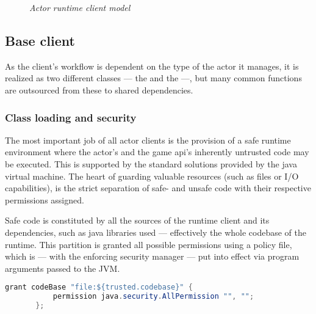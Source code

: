 \begin{figure}[h]
		\caption*{\emph{Actor runtime client model}}
	\end{figure}
	
		\subsection{Base client}

			As the client's workflow is dependent on the type of the actor it manages, it is realized as two different classes --- the  and the  ---, but many common functions are outsourced from these to shared dependencies.

			\subsubsection*{Class loading and security}
		
			The most important job of all actor clients is the provision of a safe runtime environment where the actor's and the game api's inherently untrusted code may be executed. This is supported by the standard solutions provided by the java virtual machine. The heart of guarding valuable resources (such as files or \mbox{I/O} capabilities), is the strict separation of safe- and unsafe code with their respective permissions assigned.
			
			Safe code is constituted by all the sources of the runtime client and its dependencies, such as java libraries used --- effectively the whole codebase of the runtime. This partition is granted all possible permissions using a policy file, which is --- with the enforcing security manager --- put into effect via program arguments passed to the JVM.

			\begin{center}
				\begin{minipage}{12cm}
					\begin{lstlisting}[language=Java, title={\code{client.policy}}]
	   grant codeBase "file:${trusted.codebase}" {
		   permission java.security.AllPermission "", "";
	   };
					\end{lstlisting}
				\end{minipage}
			\end{center}
		
